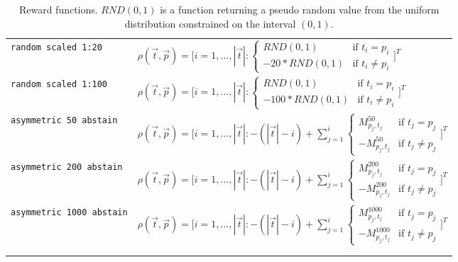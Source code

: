 \documentclass[twoside,11pt]{article}
\begin{document}
\begin{longtabu}{p{3cm}|X}
    \texttt{random scaled 1:20}
    &$\rho(\vec{t}, \vec{p}) = \Bigg[
      i=1,\dots,|\vec{t}|:
      \begin{cases}
        RND(0,1)  &\text{if } t_i = p_i \\
        -20 * RND(0,1) &\text{if } t_i \neq p_i
      \end{cases} \Bigg]^T$\\

    \texttt{random scaled 1:100}
    &$\rho(\vec{t}, \vec{p}) = \Bigg[
      i=1,\dots,|\vec{t}|:
      \begin{cases}
        RND(0,1)  &\text{if } t_i = p_i \\
        -100 * RND(0,1) &\text{if } t_i \neq p_i
      \end{cases} \Bigg]^T$\\

    \texttt{asymmetric 50 abstain}
    &$\rho(\vec{t}, \vec{p}) = \Bigg[
      i=1,\dots,|\vec{t}|: -(|\vec{t}| - i)+\sum_{j=1}^{i}
      \begin{cases}
        M^{50}_{p_j,t_j}  &\text{if } t_j = p_j \\
        -M^{50}_{p_j,t_j} &\text{if } t_j \neq p_j
      \end{cases} \Bigg]^T$\\

    \texttt{asymmetric 200 abstain}
    &$\rho(\vec{t}, \vec{p}) = \Bigg[
      i=1,\dots,|\vec{t}|: -(|\vec{t}| - i)+\sum_{j=1}^{i}
      \begin{cases}
        M^{200}_{p_j,t_j}  &\text{if } t_j = p_j \\
        -M^{200}_{p_j,t_j} &\text{if } t_j \neq p_j
      \end{cases} \Bigg]^T$\\

    \texttt{asymmetric 1000 abstain}
    &$\rho(\vec{t}, \vec{p}) = \Bigg[
      i=1,\dots,|\vec{t}|: -(|\vec{t}| - i)+\sum_{j=1}^{i}
      \begin{cases}
        M^{1000}_{p_j,t_j}  &\text{if } t_j = p_j \\
        -M^{1000}_{p_j,t_j} &\text{if } t_j \neq p_j
      \end{cases} \Bigg]^T$\\ \\

  \caption{Reward functions. $RND(0,1)$ is a function
           returning a pseudo random value from the uniform
           distribution constrained on the interval
           $(0,1)$.}
  \label{tab:rew_fns}
\end{longtabu}
\end{document}
